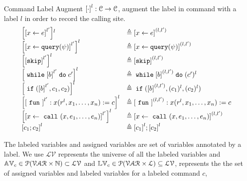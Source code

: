 {{\begin{defn}
\[\]
\end{defn}
%
\begin{defn} 
  \label{def:comlabel_aug}
  Command Label Augment $ \clabel{\cdot}^{l} : {\cdom \to \cdom}$, augment the label in command with a label $l$ 
in order to record the calling site.
\[
\begin{array}{ll}
  \clabel{\clabel{\assign{x}{\expr}}^{l'}}{}^{l} & \triangleq \clabel{\assign{x}{\expr}}^{(l, l')}\\
  \clabel{\clabel{\assign{x}{\query(\qexpr)}}^{l'}}^{l} & \triangleq \clabel{\assign{x}{\query(\qexpr)}}^{(l, l')}\\
  \clabel{\clabel{\eskip}^{l'}}^{l} & \triangleq \clabel{\eskip}^{(l, l')}\\
  \clabel{\ewhile \clabel{\bexpr}^{l'} \edo {c'}}^{l} & \triangleq \ewhile \clabel{\bexpr}^{(l, l')} \edo {(c')^{l}}\\
  \clabel{\eif(\clabel{\bexpr}^{l'} , {c_1}, {c_2})}^{l}  & \triangleq \eif(\clabel{\bexpr}^{(l, l')} , {(c_1)^{l}}, {(c_2)^{l}})\\
  \clabel{\clabel{\efun}^{l'}: x(r^l, x_1, \ldots, x_n) := c}^{l} & \triangleq \clabel{\efun}^{(l, l')}: x(r^l, x_1, \ldots, x_n) := c \\
  \clabel{\clabel{\assign{x}{\ecall(x, e_1, \ldots, e_n)}}^{l'}}^{l} & \triangleq \clabel{\assign{x}{\ecall(x, e_1, \ldots, e_n)}}^{(l, l')}\\
  \clabel{{c_1};{c_2}}^{l} &  \triangleq \clabel{c_1}^{l};\clabel{c_2}^{l}
\end{array}
\]
\end{defn}
}
The labeled variables and assigned variables are set of variables annotated by a label. 
We use  
$\mathcal{LV}$ represents the universe of all the labeled variables and 
$\mathbb{AV}_c \in \mathcal{P}(\mathcal{VAR} \times \mathbb{N}) \subset \mathcal{LV}$ and 
$\mathbb{LV}_c \in \mathcal{P}(\mathcal{VAR} \times \mathcal{L}) \subseteq \mathcal{LV}$,
represents the the set of assigned variables and labeled variables for a labeled command $c$,
}
